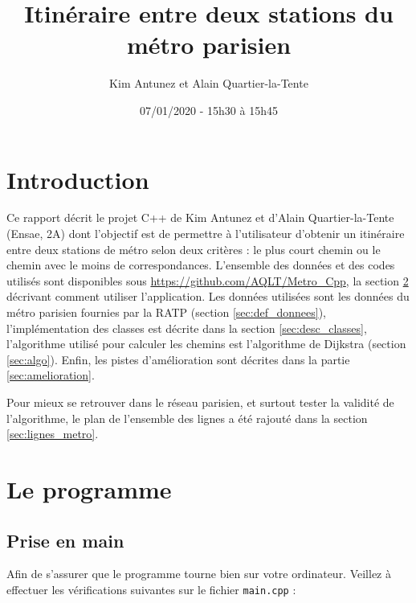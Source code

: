 \documentclass[,french]{article}
\title{Itinéraire entre deux stations du métro parisien}
\author{Kim Antunez et Alain Quartier-la-Tente}
\date{07/01/2020 - 15h30 à 15h45}
\begin{document}
\maketitle

{
\hypersetup{linkcolor=}
\setcounter{tocdepth}{2}
\tableofcontents
}
\hypertarget{introduction}{%
\section{Introduction}\label{introduction}}

Ce rapport décrit le projet C++ de Kim Antunez et d'Alain
Quartier-la-Tente (Ensae, 2A) dont l'objectif est de permettre à
l'utilisateur d'obtenir un itinéraire entre deux stations de métro selon
deux critères : le plus court chemin ou le chemin avec le moins de
correspondances. L'ensemble des données et des codes utilisés sont
disponibles sous \url{https://github.com/AQLT/Metro_Cpp}, la section
\ref{sec:le_programme} décrivant comment utiliser l'application. Les
données utilisées sont les données du métro parisien fournies par la
RATP (section \ref{sec:def_donnees}), l'implémentation des classes est
décrite dans la section \ref{sec:desc_classes}, l'algorithme utilisé
pour calculer les chemins est l'algorithme de Dijkstra (section
\ref{sec:algo}). Enfin, les pistes d'amélioration sont décrites dans la
partie \ref{sec:amelioration}.

Pour mieux se retrouver dans le réseau parisien, et surtout tester la
validité de l'algorithme, le plan de l'ensemble des lignes a été rajouté
dans la section \ref{sec:lignes_metro}.

\hypertarget{sec:le_programme}{%
\section{Le programme}\label{sec:le_programme}}

\hypertarget{prise-en-main}{%
\subsection{Prise en main}\label{prise-en-main}}

Afin de s'assurer que le programme tourne bien sur votre ordinateur.
Veillez à effectuer les vérifications suivantes sur le fichier
\texttt{main.cpp} :
\end{document}
